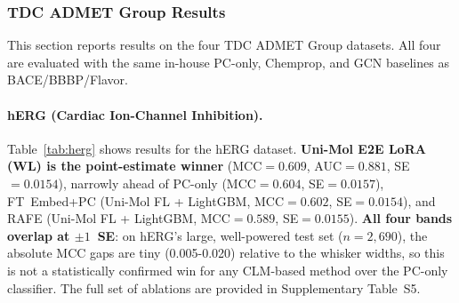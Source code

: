 \documentclass[pdflatex,sn-mathphys-num]{sn-jnl}%
\begin{document}
\begin{table}[ht]
\centering
\caption{Best configurations on BACE. $^*$ overall best by MCC.}
\label{tab:bace}
\end{table}

\subsubsection{TDC ADMET Group Results}\label{sec:new_datasets}
This section reports results on the four TDC ADMET Group datasets. All four are evaluated with the same in-house PC-only, Chemprop, and GCN baselines as BACE/BBBP/Flavor.

\paragraph{hERG (Cardiac Ion-Channel Inhibition).} Table~\ref{tab:herg} shows results for the hERG dataset. \textbf{Uni-Mol E2E LoRA (WL) is the point-estimate winner} (MCC$=0.609$, AUC$=0.881$, SE$=0.0154$), narrowly ahead of PC-only (MCC$=0.604$, SE$=0.0157$), FT~Embed+PC (Uni-Mol FL + LightGBM, MCC$=0.602$, SE$=0.0154$), and RAFE (Uni-Mol FL + LightGBM, MCC$=0.589$, SE$=0.0155$). \textbf{All four bands overlap at $\pm 1$~SE}: on hERG's large, well-powered test set ($n=2{,}690$), the absolute MCC gaps are tiny (0.005-0.020) relative to the whisker widths, so this is not a statistically confirmed win for any CLM-based method over the PC-only classifier. The full set of ablations are provided in Supplementary Table~S5.
\end{document}
